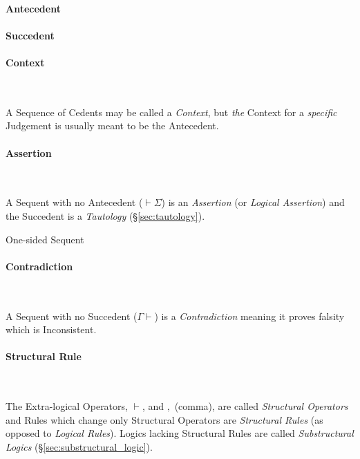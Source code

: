\paragraph{Antecedent}\label{sec:antecedent}\hfill

\paragraph{Succedent}\label{sec:succedent}\hfill

\paragraph{Context}\label{sec:sequent_context} \hfill \\\hfill

A Sequence of Cedents may be called a \emph{Context}, but \emph{the}
Context for a \emph{specific} Judgement is usually meant to be the
Antecedent.



\paragraph{Assertion}\label{sec:assertion} \hfill \\\hfill

A Sequent with no Antecedent ($\vdash \Sigma$) is an \emph{Assertion}
(or \emph{Logical Assertion}) and the Succedent is a \emph{Tautology}
(\S\ref{sec:tautology}).

One-sided Sequent



\paragraph{Contradiction}\label{sec:contradiction} \hfill \\\hfill

A Sequent with no Succedent ($\Gamma \vdash$) is a
\emph{Contradiction} meaning it proves falsity which is
Inconsistent.



\paragraph{Structural Rule}\label{sec:structural_rule} \hfill \\\hfill

The Extra-logical Operators, $\vdash$, and $,$ (comma), are called
\emph{Structural Operators} and Rules which change only Structural
Operators are \emph{Structural Rules} (as opposed to \emph{Logical
  Rules}). Logics lacking Structural Rules are called
\emph{Substructural Logics} (\S\ref{sec:substructural_logic}).



